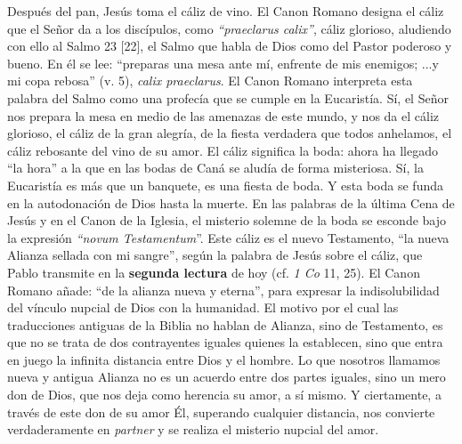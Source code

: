 			\begin{body}Después del pan, Jesús toma el cáliz de vino. El Canon Romano designa el cáliz que el Señor da a los discípulos, como \textit{“praeclarus calix”}, cáliz glorioso, aludiendo con ello al Salmo 23 [22], el Salmo que habla de Dios como del Pastor poderoso y bueno. En él se lee: “preparas una mesa ante mí, enfrente de mis enemigos; ...y mi copa rebosa” (v. 5), \textit{calix praeclarus}. El Canon Romano interpreta esta palabra del Salmo como una profecía que se cumple en la Eucaristía. Sí, el Señor nos prepara la mesa en medio de las amenazas de este mundo, y nos da el cáliz glorioso, el cáliz de la gran alegría, de la fiesta verdadera que todos anhelamos, el cáliz rebosante del vino de su amor. El cáliz significa la boda: ahora ha llegado “la hora” a la que en las bodas de Caná se aludía de forma misteriosa. Sí, la Eucaristía es más que un banquete, es una fiesta de boda. Y esta boda se funda en la autodonación de Dios hasta la muerte. En las palabras de la última Cena de Jesús y en el Canon de la Iglesia, el misterio solemne de la boda se esconde bajo la expresión \textit{“novum Testamentum}”. Este cáliz es el nuevo Testamento, “la nueva Alianza sellada con mi sangre”, según la palabra de Jesús sobre el cáliz, que Pablo transmite en la \textbf{segunda lectura} de hoy (cf. \textit{1 Co} 11, 25). El Canon Romano añade: “de la alianza nueva y eterna”, para expresar la indisolubilidad del vínculo nupcial de Dios con la humanidad. El motivo por el cual las traducciones antiguas de la Biblia no hablan de Alianza, sino de Testamento, es que no se trata de dos contrayentes iguales quienes la establecen, sino que entra en juego la infinita distancia entre Dios y el hombre. Lo que nosotros llamamos nueva y antigua Alianza no es un acuerdo entre dos partes iguales, sino un mero don de Dios, que nos deja como herencia su amor, a sí mismo. Y ciertamente, a través de este don de su amor Él, superando cualquier distancia, nos convierte verdaderamente en \textit{partner} y se realiza el misterio nupcial del amor.\end{body}
			

